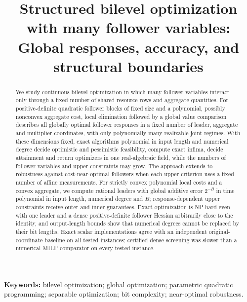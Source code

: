 \documentclass[11pt]{article}
\title{Structured bilevel optimization with many follower variables:\\
Global responses, accuracy, and structural boundaries}
\author{}
\date{}
\theoremstyle{definition}
\theoremstyle{remark}
\begin{document}
\maketitle
\begin{abstract}
We study continuous bilevel optimization in which many follower variables
interact only through a fixed number of shared resource rows and aggregate
quantities. For positive-definite quadratic follower blocks of fixed size
and a polynomial, possibly nonconvex aggregate cost, local elimination
followed by a global value comparison describes all globally optimal
follower responses in a fixed number of leader, aggregate and multiplier
coordinates, with only polynomially many realizable joint regimes. With
these dimensions fixed, exact algorithms polynomial in input length and
numerical degree decide optimistic and pessimistic feasibility, compute
exact infima, decide attainment and return optimizers in one
real-algebraic field, while the numbers of follower variables and upper
constraints may grow. The approach extends to robustness against
cost-near-optimal followers when each upper criterion uses a fixed number
of affine measurements. For strictly convex polynomial local costs and a
convex aggregate, we compute rational leaders with global additive error
$2^{-B}$ in time polynomial in input length, numerical degree and $B$;
response-dependent upper constraints receive outer and inner guarantees.
Exact optimization is NP-hard even with one leader and a dense
positive-definite follower Hessian arbitrarily close to the identity, and
output-length bounds show that numerical degrees cannot be replaced by
their bit lengths. Exact scalar implementations agree with an independent
original-coordinate baseline on all tested instances; certified dense
screening was slower than a numerical MILP comparator on every tested
instance.
\end{abstract}
\noindent\textbf{Keywords:} bilevel optimization; global optimization;
parametric quadratic programming; separable optimization; bit complexity;
near-optimal robustness.







\appendix






\end{document}
